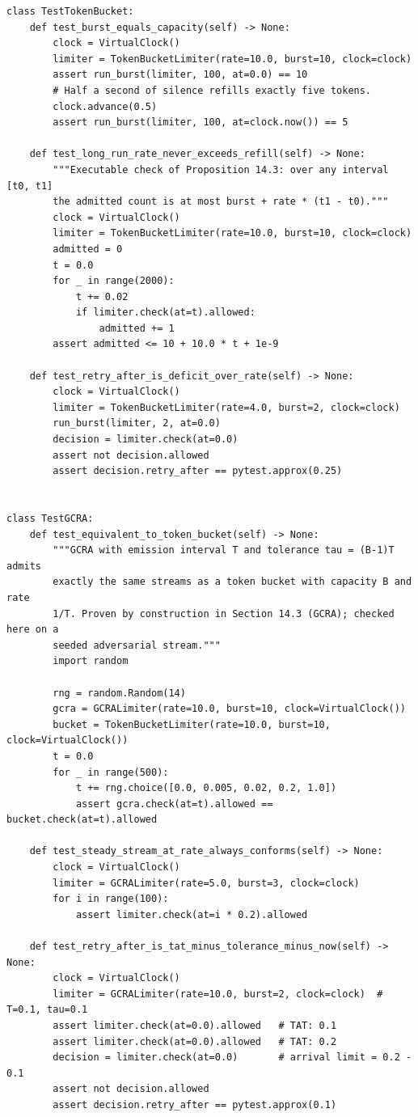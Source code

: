 \begin{verbatim}
class TestTokenBucket:
    def test_burst_equals_capacity(self) -> None:
        clock = VirtualClock()
        limiter = TokenBucketLimiter(rate=10.0, burst=10, clock=clock)
        assert run_burst(limiter, 100, at=0.0) == 10
        # Half a second of silence refills exactly five tokens.
        clock.advance(0.5)
        assert run_burst(limiter, 100, at=clock.now()) == 5

    def test_long_run_rate_never_exceeds_refill(self) -> None:
        """Executable check of Proposition 14.3: over any interval [t0, t1]
        the admitted count is at most burst + rate * (t1 - t0)."""
        clock = VirtualClock()
        limiter = TokenBucketLimiter(rate=10.0, burst=10, clock=clock)
        admitted = 0
        t = 0.0
        for _ in range(2000):
            t += 0.02
            if limiter.check(at=t).allowed:
                admitted += 1
        assert admitted <= 10 + 10.0 * t + 1e-9

    def test_retry_after_is_deficit_over_rate(self) -> None:
        clock = VirtualClock()
        limiter = TokenBucketLimiter(rate=4.0, burst=2, clock=clock)
        run_burst(limiter, 2, at=0.0)
        decision = limiter.check(at=0.0)
        assert not decision.allowed
        assert decision.retry_after == pytest.approx(0.25)


class TestGCRA:
    def test_equivalent_to_token_bucket(self) -> None:
        """GCRA with emission interval T and tolerance tau = (B-1)T admits
        exactly the same streams as a token bucket with capacity B and rate
        1/T. Proven by construction in Section 14.3 (GCRA); checked here on a
        seeded adversarial stream."""
        import random

        rng = random.Random(14)
        gcra = GCRALimiter(rate=10.0, burst=10, clock=VirtualClock())
        bucket = TokenBucketLimiter(rate=10.0, burst=10, clock=VirtualClock())
        t = 0.0
        for _ in range(500):
            t += rng.choice([0.0, 0.005, 0.02, 0.2, 1.0])
            assert gcra.check(at=t).allowed == bucket.check(at=t).allowed

    def test_steady_stream_at_rate_always_conforms(self) -> None:
        clock = VirtualClock()
        limiter = GCRALimiter(rate=5.0, burst=3, clock=clock)
        for i in range(100):
            assert limiter.check(at=i * 0.2).allowed

    def test_retry_after_is_tat_minus_tolerance_minus_now(self) -> None:
        clock = VirtualClock()
        limiter = GCRALimiter(rate=10.0, burst=2, clock=clock)  # T=0.1, tau=0.1
        assert limiter.check(at=0.0).allowed   # TAT: 0.1
        assert limiter.check(at=0.0).allowed   # TAT: 0.2
        decision = limiter.check(at=0.0)       # arrival limit = 0.2 - 0.1
        assert not decision.allowed
        assert decision.retry_after == pytest.approx(0.1)
\end{verbatim}

